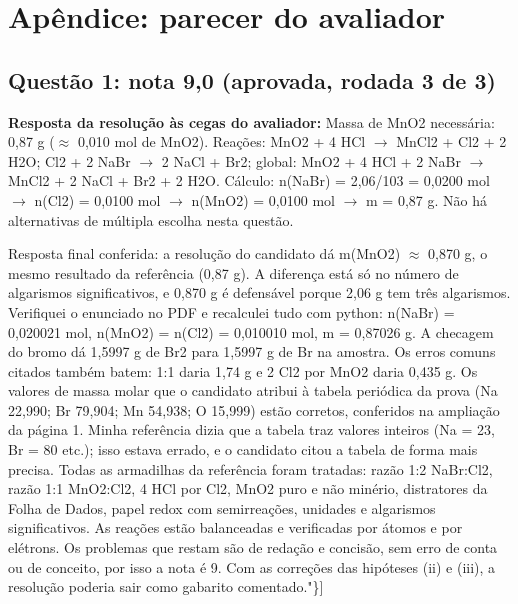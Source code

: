 \documentclass{article}%
\begin{document}
\section*{Apêndice: parecer do avaliador}%
\subsection*{Questão 1: nota 9,0 (aprovada, rodada 3 de 3)}%
\textbf{Resposta da resolução às cegas do avaliador:} Massa de MnO2 necessária: 0,87 g ($\approx$ 0,010 mol de MnO2).\newline%
\newline%
Reações: MnO2 + 4 HCl $\to$ MnCl2 + Cl2 + 2 H2O; Cl2 + 2 NaBr $\to$ 2 NaCl + Br2; global: MnO2 + 4 HCl + 2 NaBr $\to$ MnCl2 + 2 NaCl + Br2 + 2 H2O.\newline%
\newline%
Cálculo: n(NaBr) = 2,06/103 = 0,0200 mol $\to$ n(Cl2) = 0,0100 mol $\to$ n(MnO2) = 0,0100 mol $\to$ m = 0,87 g.\newline%
\newline%
Não há alternativas de múltipla escolha nesta questão.\par %
Resposta final conferida: a resolução do candidato dá m(MnO2) $\approx$ 0,870 g, o mesmo resultado da referência (0,87 g). A diferença está só no número de algarismos significativos, e 0,870 g é defensável porque 2,06 g tem três algarismos. Verifiquei o enunciado no PDF e recalculei tudo com python: n(NaBr) = 0,020021 mol, n(MnO2) = n(Cl2) = 0,010010 mol, m = 0,87026 g. A checagem do bromo dá 1,5997 g de Br2 para 1,5997 g de Br na amostra. Os erros comuns citados também batem: 1:1 daria 1,74 g e 2 Cl2 por MnO2 daria 0,435 g. Os valores de massa molar que o candidato atribui à tabela periódica da prova (Na 22,990; Br 79,904; Mn 54,938; O 15,999) estão corretos, conferidos na ampliação da página 1. Minha referência dizia que a tabela traz valores inteiros (Na = 23, Br = 80 etc.); isso estava errado, e o candidato citou a tabela de forma mais precisa. Todas as armadilhas da referência foram tratadas: razão 1:2 NaBr:Cl2, razão 1:1 MnO2:Cl2, 4 HCl por Cl2, MnO2 puro e não minério, distratores da Folha de Dados, papel redox com semirreações, unidades e algarismos significativos. As reações estão balanceadas e verificadas por átomos e por elétrons. Os problemas que restam são de redação e concisão, sem erro de conta ou de conceito, por isso a nota é 9. Com as correções das hipóteses (ii) e (iii), a resolução poderia sair como gabarito comentado."\}{]}%
\end{document}
